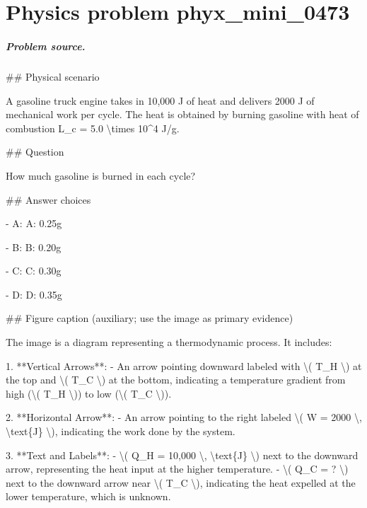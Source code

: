 
\chapter{Physics problem phyx\_mini\_0473}
\label{ch:PhyXMiniProblems_problem_phyx_mini_0473}

\paragraph{Problem source.}
\#\# Physical scenario

A gasoline truck engine takes in 10,000 J of heat and delivers 2000 J of mechanical work per cycle. The heat is obtained by burning gasoline with heat of combustion L\_c = 5.0 \textbackslash{}times 10\textasciicircum{}4 J/g.

\#\# Question

How much gasoline is burned in each cycle?

\#\# Answer choices

- A: A: 0.25g

- B: B: 0.20g

- C: C: 0.30g

- D: D: 0.35g

\#\# Figure caption (auxiliary; use the image as primary evidence)

The image is a diagram representing a thermodynamic process. It includes:

1. **Vertical Arrows**: 
   - An arrow pointing downward labeled with \textbackslash{}( T\_H \textbackslash{}) at the top and \textbackslash{}( T\_C \textbackslash{}) at the bottom, indicating a temperature gradient from high (\textbackslash{}( T\_H \textbackslash{})) to low (\textbackslash{}( T\_C \textbackslash{})).
   
2. **Horizontal Arrow**: 
   - An arrow pointing to the right labeled \textbackslash{}( W = 2000 \textbackslash{}, \textbackslash{}text\{J\} \textbackslash{}), indicating the work done by the system.

3. **Text and Labels**:
   - \textbackslash{}( Q\_H = 10,000 \textbackslash{}, \textbackslash{}text\{J\} \textbackslash{}) next to the downward arrow, representing the heat input at the higher temperature.
   - \textbackslash{}( Q\_C = ? \textbackslash{}) next to the downward arrow near \textbackslash{}( T\_C \textbackslash{}), indicating the heat expelled at the lower temperature, which is unknown.

